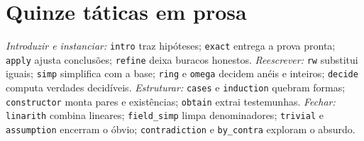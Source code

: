 \section{Quinze táticas em prosa}
\textit{Introduzir e instanciar:} \texttt{intro} traz hipóteses; \texttt{exact} entrega a prova pronta; \texttt{apply} ajusta conclusões; \texttt{refine} deixa buracos honestos. \textit{Reescrever:} \texttt{rw} substitui iguais; \texttt{simp} simplifica com a base; \texttt{ring} e \texttt{omega} decidem anéis e inteiros; \texttt{decide} computa verdades decidíveis. \textit{Estruturar:} \texttt{cases} e \texttt{induction} quebram formas; \texttt{constructor} monta pares e existências; \texttt{obtain} extrai testemunhas. \textit{Fechar:} \texttt{linarith} combina lineares; \texttt{field\_simp} limpa denominadores; \texttt{trivial} e \texttt{assumption} encerram o óbvio; \texttt{contradiction} e \texttt{by\_contra} exploram o absurdo.
